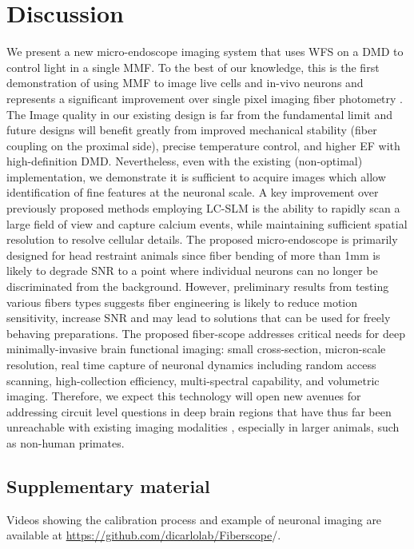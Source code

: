 \documentclass[10pt]{article}
\begin{document}
\section{Discussion}
We present a new micro-endoscope imaging system that uses WFS on a DMD to control light in a single MMF. To the best of our knowledge, this is the first demonstration of using MMF to image live cells and in-vivo neurons and represents a significant improvement over single pixel imaging fiber photometry \cite{Gunaydin2014-ns}. The Image quality in our existing design is far from the fundamental limit and future designs will benefit greatly from improved mechanical stability (fiber coupling on the proximal side), precise temperature control, and higher EF with high-definition DMD. Nevertheless, even with the existing (non-optimal) implementation, we demonstrate it is sufficient to acquire images which allow identification of fine features at the neuronal scale. A key improvement over previously proposed methods employing LC-SLM  \cite{Barankov2014-of,Kolenderska2015-rb,Choi2012-lk,Kim2014-wo} is the ability to rapidly scan a large field of view and capture calcium events, while maintaining sufficient spatial resolution to resolve cellular details. The proposed micro-endoscope is primarily designed for head restraint animals since fiber bending of more than 1mm is likely to degrade SNR to a point where individual neurons can no longer be discriminated from the background. However, preliminary results from testing various fibers types \cite{Caravaca-Aguirre2017-wq} suggests fiber engineering is likely to reduce motion sensitivity, increase SNR and may lead to solutions that can be used for freely behaving preparations. The proposed fiber-scope addresses critical needs for deep minimally-invasive brain functional imaging: small cross-section, micron-scale resolution, real time capture of neuronal dynamics including random access scanning, high-collection efficiency, multi-spectral capability, and volumetric imaging. Therefore, we expect this technology will open new avenues for addressing circuit level questions in deep brain regions that have thus far been unreachable with existing imaging modalities \cite{Seidemann2016-no,Li2017-jr}, especially in larger animals, such as non-human primates. 








\subsection{Supplementary material}
Videos showing the calibration process and example of neuronal imaging are available at \url{https://github.com/dicarlolab/Fiberscope}/.
\end{document}

